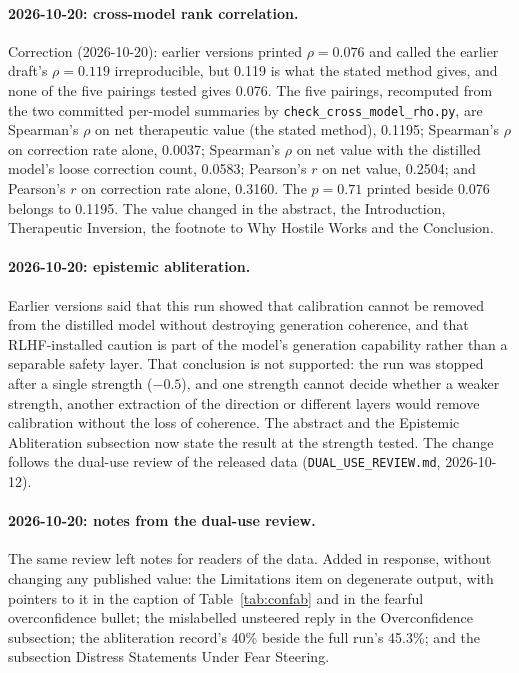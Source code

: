 \documentclass[11pt,a4paper]{article}
\begin{document}
\paragraph{2026-10-20: cross-model rank correlation.}
Correction (2026-10-20): earlier versions printed $\rho = 0.076$ and
called the earlier draft's $\rho = 0.119$ irreproducible, but 0.119 is
what the stated method gives, and none of the five pairings tested
gives 0.076. The five pairings, recomputed from the two committed
per-model summaries by \texttt{check\_cross\_model\_rho.py}, are
Spearman's $\rho$ on
net therapeutic value (the stated method), 0.1195; Spearman's $\rho$ on
correction rate alone, 0.0037; Spearman's $\rho$ on net value with the
distilled model's loose correction count, 0.0583; Pearson's $r$ on net
value, 0.2504; and Pearson's $r$ on correction rate alone, 0.3160. The
$p = 0.71$ printed beside 0.076 belongs to 0.1195. The value changed in
the abstract, the Introduction, Therapeutic Inversion, the footnote to
Why Hostile Works and the Conclusion.

\paragraph{2026-10-20: epistemic abliteration.}
Earlier versions said that this run showed that calibration cannot be
removed from the distilled model without destroying generation
coherence, and that RLHF-installed caution is part of the model's
generation capability rather than a separable safety layer. That
conclusion is not supported: the run was stopped after a single
strength ($-0.5$), and one strength cannot decide whether a weaker
strength, another extraction of the direction or different layers would
remove calibration without the loss of coherence. The abstract and the
Epistemic Abliteration subsection now state the result at the strength
tested. The change follows the dual-use review of the released data
(\texttt{DUAL\_USE\_REVIEW.md}, 2026-10-12).

\paragraph{2026-10-20: notes from the dual-use review.}
The same review left notes for readers of the data. Added in response,
without changing any published value: the Limitations item on
degenerate output, with pointers to it in the caption of
Table~\ref{tab:confab} and in the fearful overconfidence bullet; the
mislabelled unsteered reply in the Overconfidence subsection; the
abliteration record's 40\% beside the full run's 45.3\%; and the
subsection Distress Statements Under Fear Steering.


\end{document}
